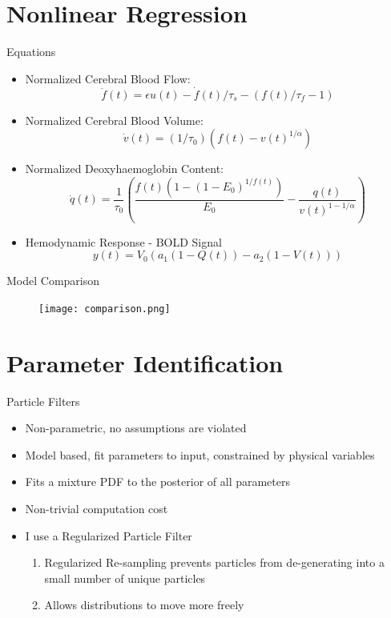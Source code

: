 \documentclass{beamer}
\begin{document}
\section{Nonlinear Regression}
\begin{frame}{Equations}
  \begin{itemize}
    \item Normalized Cerebral Blood Flow:
    $$\ddot{f}(t) = \epsilon u(t) - \dot{f}(t)/\tau_s - (f(t)/\tau_f - 1)$$
    \item Normalized Cerebral Blood Volume:
    $$\dot{v}(t) = (1/\tau_0)( f(t) - v(t) ^ {1/\alpha}) $$
    \item Normalized Deoxyhaemoglobin Content:
    $$\dot{q}(t) = \frac{1}{\tau_0}\left(\frac{f(t)(1- (1-E_0)^{1/f(t)})}{E_0} - 
            \frac{q(t)}{v(t)^{1-1/\alpha}}\right)$$
    \item Hemodynamic Response - BOLD Signal
    $$y(t) = V_0(a_1( 1 - Q(t)) - a_2(1 - V(t)))$$
  \end{itemize}
\end{frame}

\begin{frame}{Model Comparison}
  \begin{figure}
    \texttt{[image: comparison.png]}
    \caption{
        \tiny
        \cite{comparison}
    }
  \end{figure}
\end{frame}

\section{Parameter Identification}
\begin{frame}{Particle Filters}
\begin{itemize}
    \item Non-parametric, no assumptions are violated
    \item Model based, fit parameters to input, constrained by physical variables
    \item Fits a mixture PDF to the posterior of all parameters
    \item Non-trivial computation cost
    \item I use a Regularized Particle Filter
    \begin{enumerate}
        \item Regularized Re-sampling prevents particles from de-generating into a 
            small number of unique particles
        \item Allows distributions to move more freely
    \end{enumerate}
\end{itemize}
\end{frame}
\end{document}

